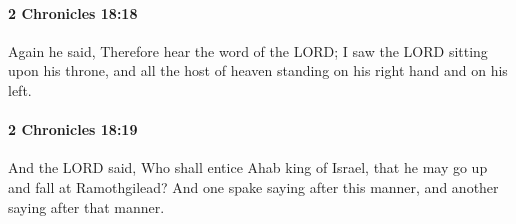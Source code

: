 		\paragraph{2 Chronicles 18:18} %
			\label{2CHRONICLES-18-18}

			Again he said, Therefore hear the word of the LORD; I saw the LORD sitting upon his throne, and all the host of heaven standing on his right hand and on his left.


		\paragraph{2 Chronicles 18:19} %
			\label{2CHRONICLES-18-19}

			And the LORD said, Who shall entice Ahab king of Israel, that he may go up and fall at Ramothgilead? And one spake saying after this manner, and another saying after that manner.

